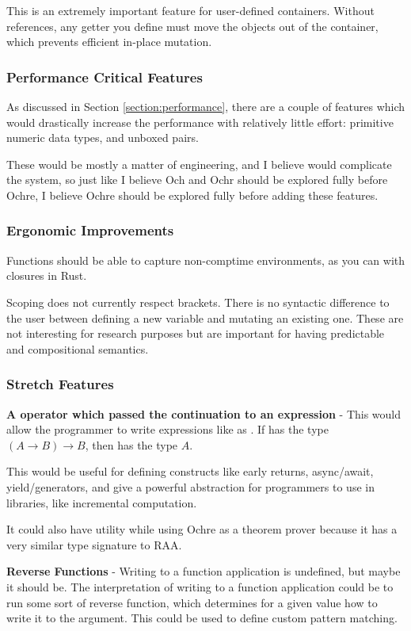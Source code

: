 \documentclass[12pt,twoside]{report}
\begin{document}
This is an extremely important feature for user-defined containers. Without references, any getter you define must move the objects out of the container, which prevents efficient in-place mutation.

\subsubsection{Performance Critical Features}
As discussed in Section \ref{section:performance}, there are a couple of features which would drastically increase the performance with relatively little effort: primitive numeric data types, and unboxed pairs.

These would be mostly a matter of engineering, and I believe would complicate the system, so just like I believe Och and Ochr should be explored fully before Ochre, I believe Ochre should be explored fully before adding these features.

\subsubsection{Ergonomic Improvements}
Functions should be able to capture non-comptime environments, as you can with closures in Rust.

Scoping does not currently respect brackets. There is no syntactic difference to the user between defining a new variable and mutating an existing one. These are not interesting for research purposes but are important for having predictable and compositional semantics.

\subsubsection{Stretch Features}
\textbf{A  operator which passed the continuation to an expression} -  This would allow the programmer to write expressions like  as . If  has the type $(A \rightarrow B) \rightarrow B$, then  has the type $A$.

This would be useful for defining constructs like early returns, async/await, yield/generators, and give a powerful abstraction for programmers to use in libraries, like incremental computation.

It could also have utility while using Ochre as a theorem prover because it has a very similar type signature to RAA.

\textbf{Reverse Functions} - Writing to a function application is undefined, but maybe it should be. The interpretation of writing to a function application could be to run some sort of reverse function, which determines for a given value how to write it to the argument. This could be used to define custom pattern matching.
\end{document}
